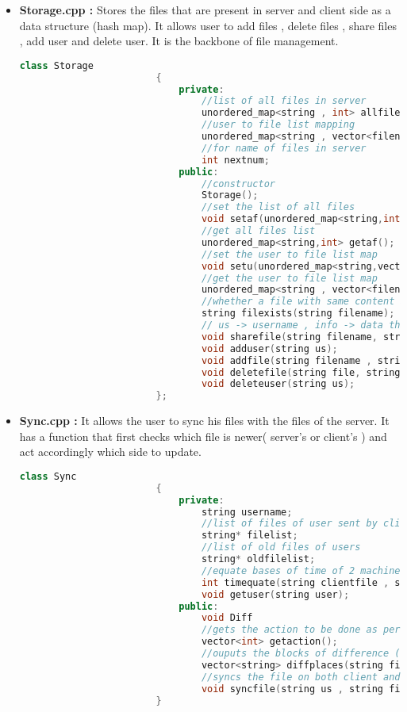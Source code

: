 \documentclass{article}
\begin{document}
\begin{itemize}
				\item \textbf{Storage.cpp : } Stores the files that are present in server and client side as a data structure (hash map). It allows user to add files , delete files , share files , add user and delete user. It is the backbone of file management.
					\begin{lstlisting}[language=C++, caption={Header file of the class Storage}]
						class Storage
						{
							private:
								//list of all files in server
								unordered_map<string , int> allfiles;
								//user to file list mapping
								unordered_map<string , vector<filenames> > usertofilelist;	
								//for name of files in server
								int nextnum;		
							public:
								//constructor
								Storage();
								//set the list of all files
								void setaf(unordered_map<string,int>);
								//get all files list
								unordered_map<string,int> getaf();
								//set the user to file list map 
								void setu(unordered_map<string,vector<filenames> > usertofilelist);
								//get the user to file list map
								unordered_map<string , vector<filenames> > getu();
								//whether a file with same content already exists
								string filexists(string filename);
								// us -> username , info -> data that user fills while signup
								void sharefile(string filename, string user1, string user2, bool permission);
								void adduser(string us);
								void addfile(string filename , string us);
								void deletefile(string file, string us);
								void deleteuser(string us);			
						};
					\end{lstlisting}
				\item \textbf{Sync.cpp : } It allows the user to sync his files with the files of the server. It has a function that first checks which file is newer( server's or client's ) and act accordingly which side to update.
					\begin{lstlisting}[language=C++, caption={Header file of the class Sync}]
						class Sync
						{
							private:
								string username;
								//list of files of user sent by client
								string* filelist;
								//list of old files of users
								string* oldfilelist;
								//equate bases of time of 2 machines (required for persistent storage)
								int timequate(string clientfile , string serverfile);
								void getuser(string user);
							public:
								void Diff
								//gets the action to be done as per modified time
								vector<int> getaction();
								//ouputs the blocks of difference ( for minimal data usage )
								vector<string> diffplaces(string filename1, string filename2);
								//syncs the file on both client and server side as per action
								void syncfile(string us , string file);
						}
					\end{lstlisting}
			\end{itemize}
\end{document}
